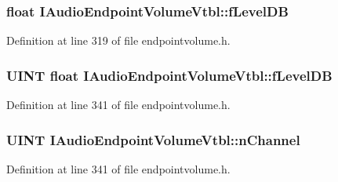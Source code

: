 \subsubsection[{\texorpdfstring{f\+Level\+DB}{fLevelDB}}]{ float I\+Audio\+Endpoint\+Volume\+Vtbl\+::f\+Level\+DB}\hypertarget{struct_i_audio_endpoint_volume_vtbl_aebb26eb723a88846e2002c3c2b3b65c7}{}\label{struct_i_audio_endpoint_volume_vtbl_aebb26eb723a88846e2002c3c2b3b65c7}


Definition at line 319 of file endpointvolume.\+h.

\subsubsection[{\texorpdfstring{f\+Level\+DB}{fLevelDB}}]{ {\bf U\+I\+NT} float I\+Audio\+Endpoint\+Volume\+Vtbl\+::f\+Level\+DB}\hypertarget{struct_i_audio_endpoint_volume_vtbl_ac2ed69e5d8db0689ac4afbf314e0bb8d}{}\label{struct_i_audio_endpoint_volume_vtbl_ac2ed69e5d8db0689ac4afbf314e0bb8d}


Definition at line 341 of file endpointvolume.\+h.

\subsubsection[{\texorpdfstring{n\+Channel}{nChannel}}]{ {\bf U\+I\+NT} I\+Audio\+Endpoint\+Volume\+Vtbl\+::n\+Channel}\hypertarget{struct_i_audio_endpoint_volume_vtbl_a2dce7641cd27f9eb30b52efe07de0cdf}{}\label{struct_i_audio_endpoint_volume_vtbl_a2dce7641cd27f9eb30b52efe07de0cdf}


Definition at line 341 of file endpointvolume.\+h.

